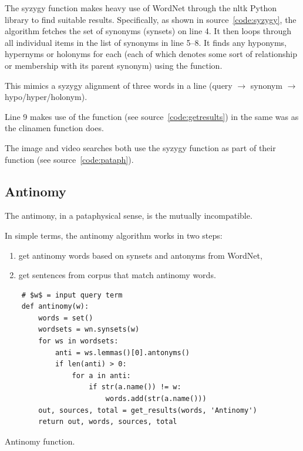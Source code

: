 The syzygy function makes heavy use of WordNet \parencite{Miller1995} through the \gls{nltk} Python library to find suitable results. Specifically, as shown in source~\ref{code:syzygy}, the algorithm fetches the set of synonyms (synsets) on line 4. It then loops through all individual items  in the list of synonyms  in line 5--8. It finds any hyponyms, hypernyms or holonyms for each  (each of which denotes some sort of relationship or membership with its parent synonym) using the  function.

This mimics a syzygy alignment of three words in a line (query $\to$ synonym $\to$ hypo/hyper/holonym).

Line 9 makes use of the  function (see source~\ref{code:getresults}) in the same was as the clinamen function does.


The image and video searches both use the syzygy function as part of their  function (see source~\ref{code:pataph}).


\subsection{Antinomy}

The antimony, in a pataphysical sense, is the mutually incompatible.

In simple terms, the antinomy algorithm works in two steps:
\begin{enumerate}
  \item get antinomy words based on synsets and antonyms from WordNet,
  \item get sentences from corpus that match antinomy words.
\end{enumerate}

\begin{listing}
  \begin{verbatim}
    # $w$ = input query term
    def antinomy(w):
        words = set()
        wordsets = wn.synsets(w)
        for ws in wordsets:
            anti = ws.lemmas()[0].antonyms()
            if len(anti) > 0:
                for a in anti:
                    if str(a.name()) != w:
                        words.add(str(a.name()))
        out, sources, total = get_results(words, 'Antinomy')
        return out, words, sources, total
  \end{verbatim}
\caption{Antinomy function.}
\label{code:antinomy}
\end{listing}

